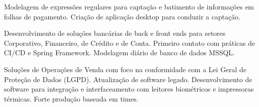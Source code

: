 \documentclass[10pt,a4paper,ragged2e]{altacv}
\begin{document}

\begin{fullwidth}
\makecvheader
\end{fullwidth}



Modelagem de expressões regulares para captação e batimento de informações em folhas de pagamento. Criação de aplicação desktop para conduzir a captação.


\divider

Desenvolvimento de soluções bancárias de back e front ends para setores Corporativo, Financeiro, de Crédito e de Conta. Primeiro contato com práticas de CI/CD e Spring Framework. Modelagem diário de banco de dados MSSQL.

{}

\divider

Soluções de Operações de Venda com foco na conformidade com a Lei Geral de Proteção de Dados (LGPD). Atualização de software legado. Desenvolvimento de software para integração e interfaceamento com leitores biométricos e impressoras térmicas. Forte produção baseada em times. 
\end{document}
